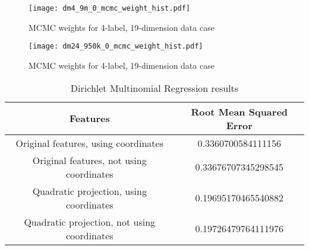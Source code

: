 

\begin{figure}[H]
    \centerline{\texttt{[image: dm4\_9m\_0\_mcmc\_weight\_hist.pdf]}}
    \caption{MCMC weights for 4-label, 19-dimension data case }
    \label{fig:4l-mcmc_weights}
\end{figure}

\begin{figure}[H]
    \centerline{\texttt{[image: dm24\_950k\_0\_mcmc\_weight\_hist.pdf]}}
    \caption{MCMC weights for 4-label, 19-dimension data case }
    \label{fig:24l-mcmc_weights}
\end{figure}

\begin{table}[H]
    \centering
    \begin{tabular}{|c|c|}
        \hline
        Features & Root Mean Squared Error \\\hline
        Original features, using coordinates & 0.3360700584111156 \\
        Original features, not using coordinates & 0.33676707345298545 \\
        Quadratic projection, using coordinates & 0.19695170465540882 \\
        Quadratic projection, not using coordinates & 0.19726479764111976 \\
        \hline
    \end{tabular}
    \label{table:dmbasicresults}
    \caption{Dirichlet Multinomial Regression results}
\end{table}

